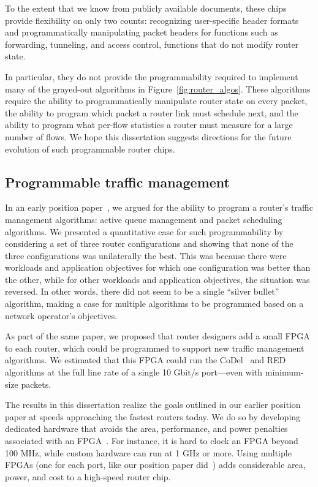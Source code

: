 To the extent that we know from publicly available documents, these chips
provide flexibility on only two counts: recognizing user-specific header
formats and programmatically manipulating packet headers for functions such as
forwarding, tunneling, and access control, \ie functions that do not modify
router state.

In particular, they do not provide the programmability required to implement
many of the grayed-out algorithms in Figure~\ref{fig:router_algos}.  These
algorithms require the ability to programmatically manipulate router state on
every packet, the ability to program which packet a router link must schedule
next, and the ability to program what per-flow statistics a router must measure
for a large number of flows. We hope this dissertation suggests directions for
the future evolution of such programmable router chips.

\subsection{Programmable traffic management}

In an early position paper~\cite{nosilverbullet}, we argued for the ability to
program a router's traffic management algorithms: active queue management and
packet scheduling algorithms. We presented a quantitative case for such
programmability by considering a set of three router configurations and showing
that none of the three configurations was unilaterally the best. This was
because there were workloads and application objectives for which one
configuration was better than the other, while for other workloads and
application objectives, the situation was reversed. In other words, there did
not seem to be a single ``silver bullet'' algorithm, making a case for multiple
algorithms to be programmed based on a network operator's objectives.

As part of the same paper, we proposed that router designers add a small FPGA
to each router, which could be programmed to support new traffic management
algorithms. We estimated that this FPGA could run the CoDel~\cite{codel} and
RED~\cite{red} algorithms at the full line rate of a single 10 Gbit/s
port---even with minimum-size packets.

The results in this dissertation realize the goals outlined in our earlier
position paper at speeds approaching the fastest routers today. We do so by
developing dedicated hardware that avoids the area, performance, and power
penalties associated with an FPGA~\cite{fpga_asic_gap}. For instance, it is
hard to clock an FPGA beyond 100 MHz, while custom hardware can run at 1 GHz or
more. Using multiple FPGAs (\eg one for each port, like our position paper
did~\cite{nosilverbullet}) adds considerable area, power, and cost to a
high-speed router chip.

